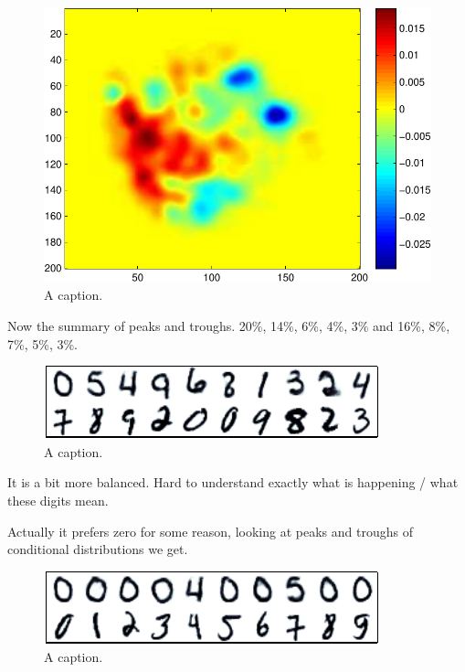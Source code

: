 \documentclass{article} %
\begin{document}
\begin{figure}[ht]
\centering
\includegraphics[width=0.98\columnwidth]{figures/many_rbm_witness}
\caption{
A caption.
}
\label{fig:many_rbm_witness}
\end{figure}

Now the summary of peaks and troughs.
20\%, 14\%, 6\%, 4\%, 3\% and 16\%, 8\%, 7\%, 5\%, 3\%.

\begin{figure}[ht]
\centering
\includegraphics[width=0.98\columnwidth]{figures/many_rbm_witness_peaks}
\caption{
A caption.
}
\label{fig:many_rbm_witness_peaks}
\end{figure}

It is a bit more balanced.
Hard to understand exactly what is happening / what these digits mean.

Actually it prefers zero for some reason, looking at peaks and troughs of conditional distributions we get.

\begin{figure}[ht]
\centering
\includegraphics[width=0.98\columnwidth]{figures/many_rbm_cond}
\caption{
A caption.
}
\label{fig:many_rbm_cond}
\end{figure}
\end{document}
